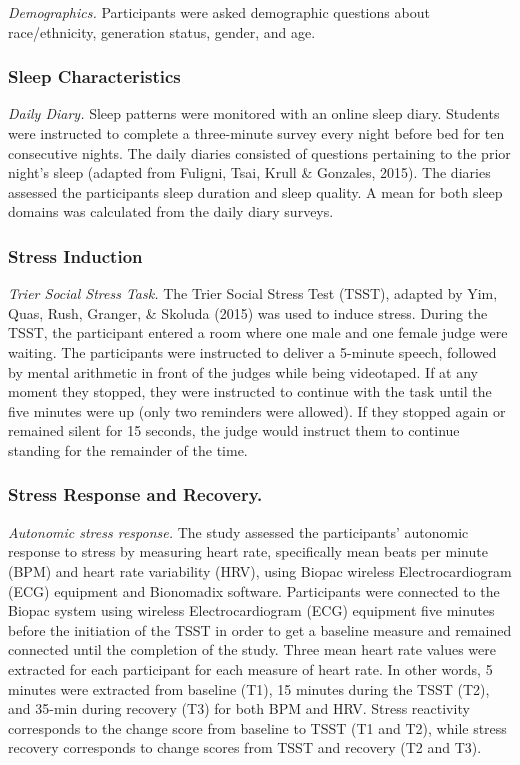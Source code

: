 \documentclass[man, fleqn, noextraspace]{apa6}
\begin{document}
\emph{Demographics.} Participants were asked demographic questions about race/ethnicity, generation status, gender, and age.

\hypertarget{sleep-characteristics}{%
\subsubsection{Sleep Characteristics}\label{sleep-characteristics}}

\emph{Daily Diary.} Sleep patterns were monitored with an online sleep diary. Students were instructed to complete a three-minute survey every night before bed for ten consecutive nights. The daily diaries consisted of questions pertaining to the prior night's sleep (adapted from Fuligni, Tsai, Krull \& Gonzales, 2015). The diaries assessed the participants sleep duration and sleep quality. A mean for both sleep domains was calculated from the daily diary surveys.

\hypertarget{stress-induction}{%
\subsubsection{Stress Induction}\label{stress-induction}}

\emph{Trier Social Stress Task.} The Trier Social Stress Test (TSST), adapted by Yim, Quas, Rush, Granger, \& Skoluda (2015) was used to induce stress. During the TSST, the participant entered a room where one male and one female judge were waiting. The participants were instructed to deliver a 5-minute speech, followed by mental arithmetic in front of the judges while being videotaped. If at any moment they stopped, they were instructed to continue with the task until the five minutes were up (only two reminders were allowed). If they stopped again or remained silent for 15 seconds, the judge would instruct them to continue standing for the remainder of the time.

\hypertarget{stress-response-and-recovery.}{%
\subsubsection{Stress Response and Recovery.}\label{stress-response-and-recovery.}}

\emph{Autonomic stress response.} The study assessed the participants' autonomic response to stress by measuring heart rate, specifically mean beats per minute (BPM) and heart rate variability (HRV), using Biopac wireless Electrocardiogram (ECG) equipment and Bionomadix software. Participants were connected to the Biopac system using wireless Electrocardiogram (ECG) equipment five minutes before the initiation of the TSST in order to get a baseline measure and remained connected until the completion of the study. Three mean heart rate values were extracted for each participant for each measure of heart rate. In other words, 5 minutes were extracted from baseline (T1), 15 minutes during the TSST (T2), and 35-min during recovery (T3) for both BPM and HRV. Stress reactivity corresponds to the change score from baseline to TSST (T1 and T2), while stress recovery corresponds to change scores from TSST and recovery (T2 and T3).
\end{document}
